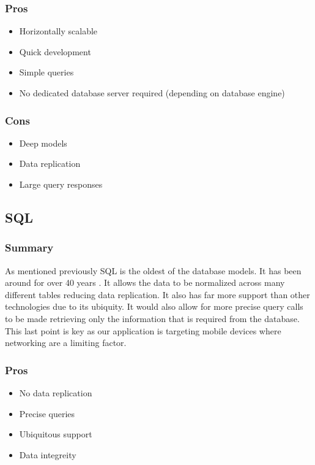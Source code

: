 \documentclass[draftclsnofoot,onecolumn,journal,letterpaper,compsoc,10pt]{IEEEtran}
\begin{document}
        \subsubsection{Pros}
        
        \begin{itemize}
            \item Horizontally scalable
            \item Quick development
            \item Simple queries
            \item No dedicated database server required (depending on database engine)
        \end{itemize}
        
        \subsubsection{Cons}
        
        \begin{itemize}
            \item Deep models
            \item Data replication
            \item Large query responses
        \end{itemize}
    
    \subsection{SQL}
    
        \subsubsection{Summary}
        
        As mentioned previously SQL is the oldest of the database models.  It has been around for over 40 years \cite{sqlizer}.  It allows the data to be normalized across many different tables reducing data replication.  It also has far more support than other technologies due to its ubiquity.  It would also allow for more precise query calls to be made retrieving only the information that is required from the database.  This last point is key as our application is targeting mobile devices where networking are a limiting factor.
        
        \subsubsection{Pros}
        \begin{itemize}
            \item No data replication
            \item Precise queries
            \item Ubiquitous support
            \item Data integreity
        \end{itemize}
        
\end{document}
